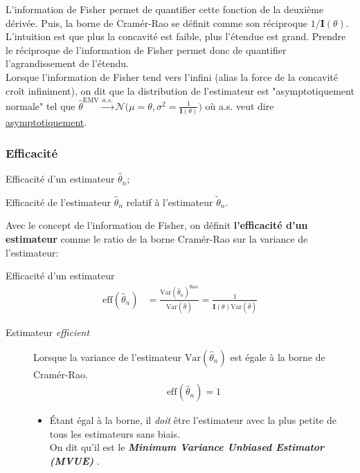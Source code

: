 \documentclass[10pt, french]{article}
\begin{document}
\begin{multicols*}{2}
L'information de Fisher permet de quantifier cette fonction de la deuxième dérivée. Puis, la borne de Cramér-Rao se définit comme son réciproque $1 / \bm{I}(\theta)$. L'intuition est que plus la concavité est faible, plus l'étendue est grand. Prendre le réciproque de l'information de Fisher permet donc de quantifier l'agrandissement de l'étendu.\\

Lorsque l'information de Fisher tend vers l'infini (alias la force de la concavité croît infiniment), on dit que la distribution de l'estimateur est "asymptotiquement normale" tel que $\hat\theta^{\text{EMV}} \overset{a.s.}{\rightarrow} \mathcal{N}\Big(\mu = \theta, \sigma^{2} = \frac{1}{\bm{I}(\theta)}\Big)$ où a.s. veut dire \hyperlink{asympto}{asymptotiquement}.

\columnbreak
\subsubsection{Efficacité}
\begin{distributions}[Notation]
\begin{description}[font = \normalfont]
	\item[$\text{eff}(\hat{\theta}_{n})$]	Efficacité d'un estimateur $\hat{\theta}_{n}$;
	\item[$\text{eff}(\hat\theta_{n}, \tilde\theta_{n})$]	Efficacité de l'estimateur $\hat{\theta}_{n}$ relatif à l'estimateur $\tilde{\theta}_{n}$.
\end{description}
\end{distributions}

Avec le concept de l'information de Fisher, on définit \textbf{l'efficacité d'un estimateur} comme le ratio de la borne Cramér-Rao sur la variance de l'estimateur:
\begin{algo}{Efficacité d'un estimateur}
\begin{align*}
	\text{eff}(\hat{\theta}_{n})
	&=	\frac{\text{Var}(\hat{\theta}_{n})^{\text{Rao}}}{\text{Var}(\hat{\theta})} 
	=	\frac{1}{\bm{I}(\theta)\text{Var}(\hat{\theta})}
\end{align*}
\tcbline
\begin{description}
	\item[Estimateur \og \textit{efficient} \fg{}]	Lorsque la variance de l'estimateur $\text{Var}(\hat{\theta}_{n})$ est égale à la borne de Cramér-Rao.
		\begin{align*}
		\text{eff}(\hat{\theta}_{n}) = 1
		\end{align*}
	\begin{itemize}[leftmargin = *]
	\item	Étant égal à la borne, il \textit{doit} être l'estimateur avec la plus petite de tous les estimateurs sans biais.\\
	 		On dit qu'il est le \og \textbf{\textit{Minimum Variance Unbiased Estimator (MVUE)}} \fg{}. 
	\end{itemize}
\end{description}
\end{algo}


\end{multicols*}
\end{document}
